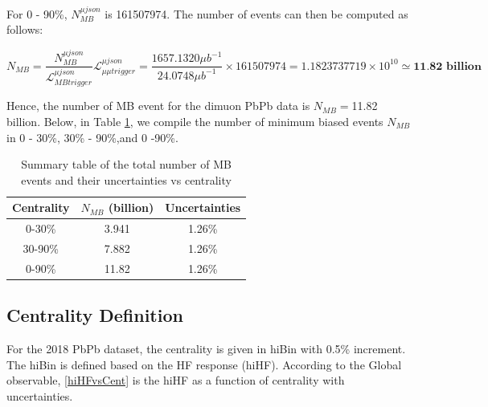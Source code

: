 \fi

For 0 - 90\%, $N_{MB}^{\mu json}$ is 161507974. The number of events can then be computed as follows:

\begin{equation}
N_{MB} = \frac{N^{\mu json}_{MB}}{\mathcal{L}_{MB trigger}^{\mu json}} \mathcal{L}_{\mu\mu trigger}^{\mu json} = \frac{1657.1320 \mu b^{-1}}{24.0748  \mu b^{-1}} \times 161507974 =  1.1823737719 \times 10^{10} \simeq  \textbf{11.82 billion}
\end{equation}

Hence, the number of MB event for the dimuon PbPb data is $N_{MB} = $11.82 billion. Below, in Table \ref{NMBUsedCent}, we compile the number of minimum biased events $N_{MB}$ in 0 - 30\%, 30\% - 90\%,and 0 -90\%. 

\begin{table}[h]
\begin{center}
\caption{Summary table of the total number of MB events and their uncertainties vs centrality}
\vspace{1em}
\label{NMBUsedCent}
  \begin{tabular}{ |c | c| c| }
    \hline 
Centrality & $N_{MB}$ (billion) & Uncertainties  \\
     \hline
         \hline
0-30\% &  3.941 & 1.26\% \\
30-90\% & 7.882 & 1.26\% \\
0-90\% & 11.82 & 1.26\% \\
     \hline
    \hline
\end{tabular}
\end{center}
\end{table}


\subsection{Centrality Definition}

For the 2018 PbPb dataset, the centrality is given in hiBin with 0.5\% increment. The hiBin is defined based on the HF response (hiHF). According to the Global observable, \ref{hiHFvsCent} is the hiHF as a function of centrality with uncertainties.


